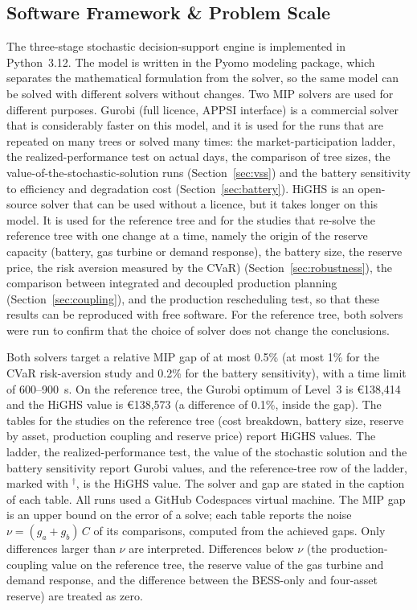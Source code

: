 \documentclass[5p,times,twocolumn]{elsarticle}
\begin{document}
\subsection{Software Framework \& Problem Scale}
The three-stage stochastic decision-support engine is implemented in Python~3.12. The model is written in the Pyomo modeling package, which separates the mathematical formulation from the solver, so the same model can be solved with different solvers without changes. Two MIP solvers are used for different purposes. Gurobi (full licence, APPSI interface) is a commercial solver that is considerably faster on this model, and it is used for the runs that are repeated on many trees or solved many times: the market-participation ladder, the realized-performance test on actual days, the comparison of tree sizes, the value-of-the-stochastic-solution runs (Section~\ref{sec:vss}) and the battery sensitivity to efficiency and degradation cost (Section~\ref{sec:battery}). HiGHS is an open-source solver that can be used without a licence, but it takes longer on this model. It is used for the reference tree and for the studies that re-solve the reference tree with one change at a time, namely the origin of the reserve capacity (battery, gas turbine or demand response), the battery size, the reserve price, the risk aversion measured by the CVaR) (Section~\ref{sec:robustness}), the comparison between integrated and decoupled production planning (Section~\ref{sec:coupling}), and the production rescheduling test, so that these results can be reproduced with free software. For the reference tree, both solvers were run to confirm that the choice of solver does not change the conclusions.

Both solvers target a relative MIP gap of at most 0.5\% (at most 1\% for the CVaR risk-aversion study and 0.2\% for the battery sensitivity), with a time limit of 600--900~s. On the reference tree, the Gurobi optimum of Level~3 is \euro 138,414 and the HiGHS value is \euro 138,573 (a difference of 0.1\%, inside the gap). The tables for the studies on the reference tree (cost breakdown, battery size, reserve by asset, production coupling and reserve price) report HiGHS values. The ladder, the realized-performance test, the value of the stochastic solution and the battery sensitivity report Gurobi values, and the reference-tree row of the ladder, marked with $^\dagger$, is the HiGHS value. The solver and gap are stated in the caption of each table. All runs used a GitHub Codespaces virtual machine. The MIP gap is an upper bound on the error of a solve; each table reports the noise
$\nu=(g_a+g_b)\,C$ of its comparisons, computed from the achieved gaps. Only
differences larger than $\nu$ are interpreted. Differences below $\nu$ (the
production-coupling value on the reference tree, the reserve value of the gas turbine
and demand response, and the difference between the BESS-only and four-asset
reserve) are treated as zero.
\end{document}
